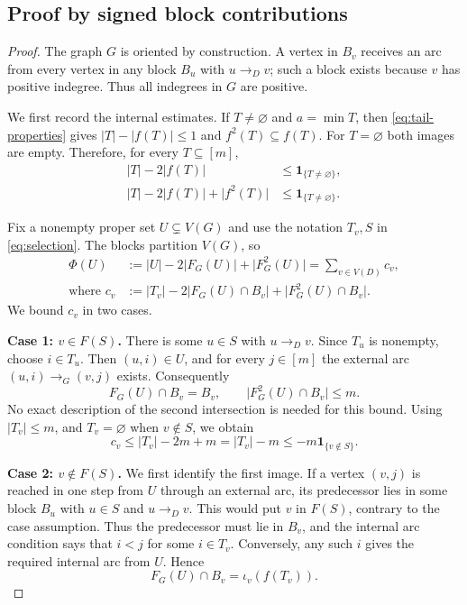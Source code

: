 \documentclass[11pt]{article}
\newcommand{\abs}[1]{\lvert#1\rvert}
\newcommand{\ind}[1]{\mathbf 1_{\{#1\}}}
\begin{document}
\subsection{Proof by signed block contributions}
\begin{proof}
The graph $G$ is oriented by construction. A vertex in $B_v$ receives
an arc from every vertex in any block $B_u$ with $u\to_Dv$; such a
block exists because $v$ has positive indegree. Thus all indegrees in
$G$ are positive.

We first record the internal estimates. If $T\ne\varnothing$ and
$a=\min T$, then \eqref{eq:tail-properties} gives
$\abs T-\abs{f(T)}\le1$ and $f^2(T)\subseteq f(T)$. For
$T=\varnothing$ both images are empty. Therefore, for every
$T\subseteq[m]$,
\begin{equation}
 \begin{aligned}
 \abs T-2\abs{f(T)}&\le\ind{T\ne\varnothing},\\
 \abs T-2\abs{f(T)}+\abs{f^2(T)}&\le\ind{T\ne\varnothing}.
 \end{aligned}
 \label{eq:internal-bounds}
\end{equation}

Fix a nonempty proper set $U\subsetneq V(G)$ and use the notation
$T_v,S$ in \eqref{eq:selection}. The blocks partition $V(G)$, so
\begin{equation}
 \begin{aligned}
 \Phi(U)&:=\abs U-2\abs{F_G(U)}+\abs{F_G^2(U)}
           =\sum_{v\in V(D)}c_v,\\
 \text{where }c_v&:=\abs{T_v}-2\abs{F_G(U)\cap B_v}
                        +\abs{F_G^2(U)\cap B_v}.
 \end{aligned}
 \label{eq:proof-block-sum}
\end{equation}
We bound $c_v$ in two cases.

\medskip\noindent\textbf{Case 1: $v\in F(S)$.}
There is some $u\in S$ with $u\to_Dv$. Since $T_u$ is nonempty,
choose $i\in T_u$. Then $(u,i)\in U$, and for every $j\in[m]$ the
external arc $(u,i)\to_G(v,j)$ exists. Consequently
\[
 F_G(U)\cap B_v=B_v,
 \qquad\abs{F_G^2(U)\cap B_v}\le m.
\]
No exact description of the second intersection is needed for this bound.
Using $\abs{T_v}\le m$, and $T_v=\varnothing$ when $v\notin S$,
we obtain
\begin{equation}
 c_v\le\abs{T_v}-2m+m
       =\abs{T_v}-m
       \le -m\ind{v\notin S}.
 \label{eq:case-one}
\end{equation}

\medskip\noindent\textbf{Case 2: $v\notin F(S)$.}
We first identify the first image. If a vertex $(v,j)$ is reached in
one step from $U$ through an external arc, its predecessor lies in
some block $B_u$ with $u\in S$ and $u\to_Dv$. This would put
$v$ in $F(S)$, contrary to the case assumption. Thus the predecessor
must lie in $B_v$, and the internal arc condition says that
$i<j$ for some $i\in T_v$. Conversely, any such $i$ gives the
required internal arc from $U$. Hence
\begin{equation}
                    F_G(U)\cap B_v=\iota_v(f(T_v)).
 \label{eq:case-two-first}
\end{equation}


\end{proof}
\end{document}
